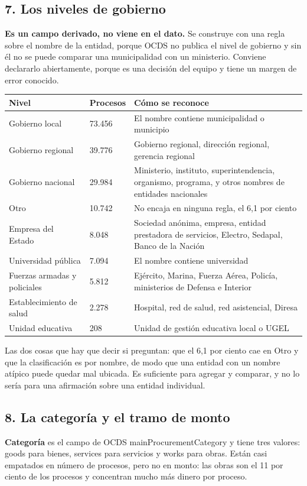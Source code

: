 \documentclass[11pt]{article}
\begin{document}
\subsection*{7. Los niveles de gobierno}
\textbf{Es un campo derivado, no viene en el dato.} Se construye con una regla sobre el nombre de la entidad, porque OCDS no publica el nivel de gobierno y sin él no se puede comparar una municipalidad con un ministerio. Conviene declararlo abiertamente, porque es una decisión del equipo y tiene un margen de error conocido.

\begin{center}\footnotesize
\begin{tabularx}{\linewidth}{Q{0.535}Q{0.537}Q{1.928}}
\toprule
\textbf{Nivel} & \textbf{Procesos} & \textbf{Cómo se reconoce} \\
\midrule
Gobierno local & 73.456 & El nombre contiene municipalidad o municipio \\
Gobierno regional & 39.776 & Gobierno regional, dirección regional, gerencia regional \\
Gobierno nacional & 29.984 & Ministerio, instituto, superintendencia, organismo, programa, y otros nombres de entidades nacionales \\
Otro & 10.742 & No encaja en ninguna regla, el 6,1 por ciento \\
Empresa del Estado & 8.048 & Sociedad anónima, empresa, entidad prestadora de servicios, Electro, Sedapal, Banco de la Nación \\
Universidad pública & 7.094 & El nombre contiene universidad \\
Fuerzas armadas y policiales & 5.812 & Ejército, Marina, Fuerza Aérea, Policía, ministerios de Defensa e Interior \\
Establecimiento de salud & 2.278 & Hospital, red de salud, red asistencial, Diresa \\
Unidad educativa & 208 & Unidad de gestión educativa local o UGEL \\
\bottomrule
\end{tabularx}
\end{center}
Las dos cosas que hay que decir si preguntan: que el 6,1 por ciento cae en Otro y que la clasificación es por nombre, de modo que una entidad con un nombre atípico puede quedar mal ubicada. Es suficiente para agregar y comparar, y no lo sería para una afirmación sobre una entidad individual.

\subsection*{8. La categoría y el tramo de monto}
\textbf{Categoría} es el campo de OCDS mainProcurementCategory y tiene tres valores: goods para bienes, services para servicios y works para obras. Están casi empatados en número de procesos, pero no en monto: las obras son el 11 por ciento de los procesos y concentran mucho más dinero por proceso.
\end{document}
